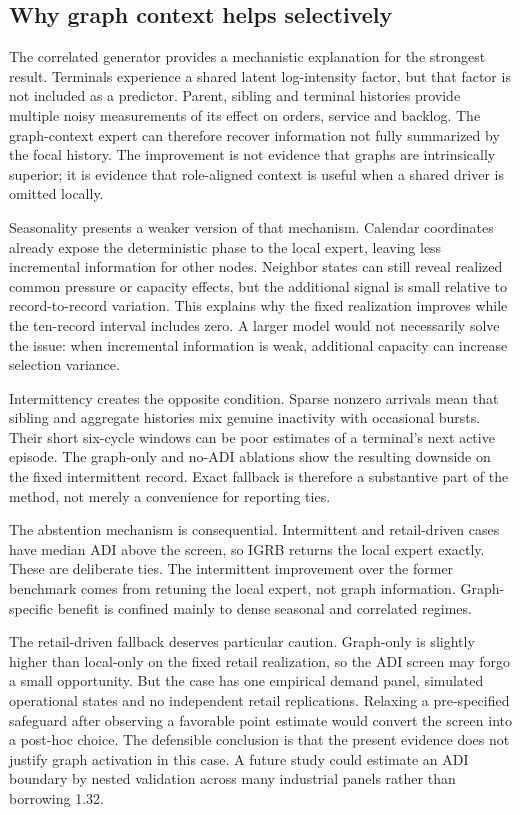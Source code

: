 \documentclass[11pt,a4paper]{article}
\begin{document}
\subsection{Why graph context helps selectively}
The correlated generator provides a mechanistic explanation for the strongest result. Terminals experience a shared latent log-intensity factor, but that factor is not included as a predictor. Parent, sibling and terminal histories provide multiple noisy measurements of its effect on orders, service and backlog. The graph-context expert can therefore recover information not fully summarized by the focal history. The improvement is not evidence that graphs are intrinsically superior; it is evidence that role-aligned context is useful when a shared driver is omitted locally.

Seasonality presents a weaker version of that mechanism. Calendar coordinates already expose the deterministic phase to the local expert, leaving less incremental information for other nodes. Neighbor states can still reveal realized common pressure or capacity effects, but the additional signal is small relative to record-to-record variation. This explains why the fixed realization improves while the ten-record interval includes zero. A larger model would not necessarily solve the issue: when incremental information is weak, additional capacity can increase selection variance.

Intermittency creates the opposite condition. Sparse nonzero arrivals mean that sibling and aggregate histories mix genuine inactivity with occasional bursts. Their short six-cycle windows can be poor estimates of a terminal's next active episode. The graph-only and no-ADI ablations show the resulting downside on the fixed intermittent record. Exact fallback is therefore a substantive part of the method, not merely a convenience for reporting ties.

The abstention mechanism is consequential. Intermittent and retail-driven cases have median ADI above the screen, so IGRB returns the local expert exactly. These are deliberate ties. The intermittent improvement over the former benchmark comes from retuning the local expert, not graph information. Graph-specific benefit is confined mainly to dense seasonal and correlated regimes.

The retail-driven fallback deserves particular caution. Graph-only is slightly higher than local-only on the fixed retail realization, so the ADI screen may forgo a small opportunity. But the case has one empirical demand panel, simulated operational states and no independent retail replications. Relaxing a pre-specified safeguard after observing a favorable point estimate would convert the screen into a post-hoc choice. The defensible conclusion is that the present evidence does not justify graph activation in this case. A future study could estimate an ADI boundary by nested validation across many industrial panels rather than borrowing 1.32.
\end{document}
